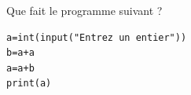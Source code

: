 \begin{exo}{}
	Que fait le programme suivant ?

	\begin{lstlisting}
a=int(input("Entrez un entier"))
b=a+a
a=a+b
print(a)
\end{lstlisting}
\end{exo}
